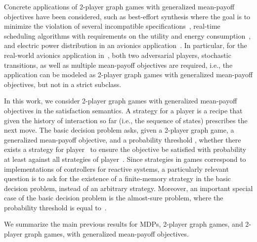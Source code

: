 \documentclass{article}
\newcommand{\half}{}
\begin{document}
Concrete applications of 2\half-player graph games with generalized mean-payoff objectives have been considered, such as 
best-effort synthesis where the goal is to minimize the violation 
of several incompatible specifications~\cite{CGHRT12}, real-time
scheduling algorithms with requirements on the utility and energy consumption~\cite{CPKS14},
and electric power distribution in an avionics application~\cite{BKTW15}.
In particular, for the real-world avionics application in~\cite{BKTW15},
both two adversarial players, stochastic transitions, as well as multiple mean-payoff
objectives are required, i.e., the application can be modeled as 2\half-player
graph games with generalized mean-payoff objectives, but not in a strict subclass.




\smallskip{} 
In this work, we consider 2\half-player graph games with generalized 
mean-payoff objectives in the satisfaction semantics.
A strategy for a player is a recipe that given the history of interaction so far 
(i.e., the sequence of states) prescribes the next move.
The basic decision problem asks, given a 2\half-player graph 
game, a generalized mean-payoff objective, and a probability threshold 
, whether there exists a strategy for player~ to ensure the objective 
be satisfied with probability at least  against all strategies of 
player~. 
Since strategies in games correspond to implementations of controllers for 
reactive systems, a particularly relevant question is to ask for the existence 
of a finite-memory strategy in the basic decision problem, instead of an 
arbitrary strategy.
Moreover, an important special case of the basic decision problem is the 
almost-sure problem, where the probability threshold  is equal to~.


\smallskip{}
We summarize the main previous results for MDPs, 2-player graph games, and 
2\half-player graph games, with generalized mean-payoff objectives.
\end{document}
